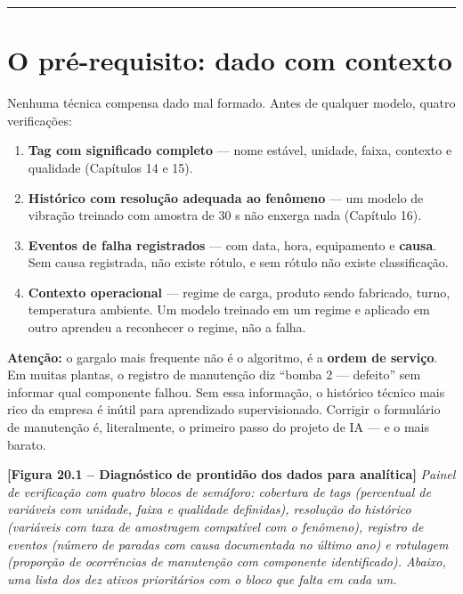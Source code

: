 \begin{center}\rule{0.5\linewidth}{0.5pt}\end{center}

\section{O pré-requisito: dado com contexto}\label{o-pruxe9-requisito-dado-com-contexto}

Nenhuma técnica compensa dado mal formado. Antes de qualquer modelo, quatro verificações:

\begin{enumerate}
\def\labelenumi{\arabic{enumi}.}
\tightlist
\item
  \textbf{Tag com significado completo} --- nome estável, unidade, faixa, contexto e qualidade
  (Capítulos 14 e 15).
\item
  \textbf{Histórico com resolução adequada ao fenômeno} --- um modelo de vibração treinado com amostra de
  30 s não enxerga nada (Capítulo 16).
\item
  \textbf{Eventos de falha registrados} --- com data, hora, equipamento e \textbf{causa}. Sem causa registrada,
  não existe rótulo, e sem rótulo não existe classificação.
\item
  \textbf{Contexto operacional} --- regime de carga, produto sendo fabricado, turno, temperatura ambiente.
  Um modelo treinado em um regime e aplicado em outro aprendeu a reconhecer o regime, não a falha.
\end{enumerate}

\begin{caixaatencao}

\textbf{Atenção:} o gargalo mais frequente não é o algoritmo, é a \textbf{ordem de serviço}. Em muitas
plantas, o registro de manutenção diz ``bomba 2 --- defeito'' sem informar qual componente falhou.
Sem essa informação, o histórico técnico mais rico da empresa é inútil para aprendizado
supervisionado. Corrigir o formulário de manutenção é, literalmente, o primeiro passo do projeto de
IA --- e o mais barato.

\end{caixaatencao}

\begin{caixafigura}

\textbf{{[}Figura 20.1 -- Diagnóstico de prontidão dos dados para analítica{]}}
\emph{Painel de verificação com quatro blocos de semáforo: cobertura de tags (percentual de variáveis com unidade, faixa e qualidade definidas), resolução do histórico (variáveis com taxa de amostragem compatível com o fenômeno), registro de eventos (número de paradas com causa documentada no último ano) e rotulagem (proporção de ocorrências de manutenção com componente identificado). Abaixo, uma lista dos dez ativos prioritários com o bloco que falta em cada um.}

\end{caixafigura}

